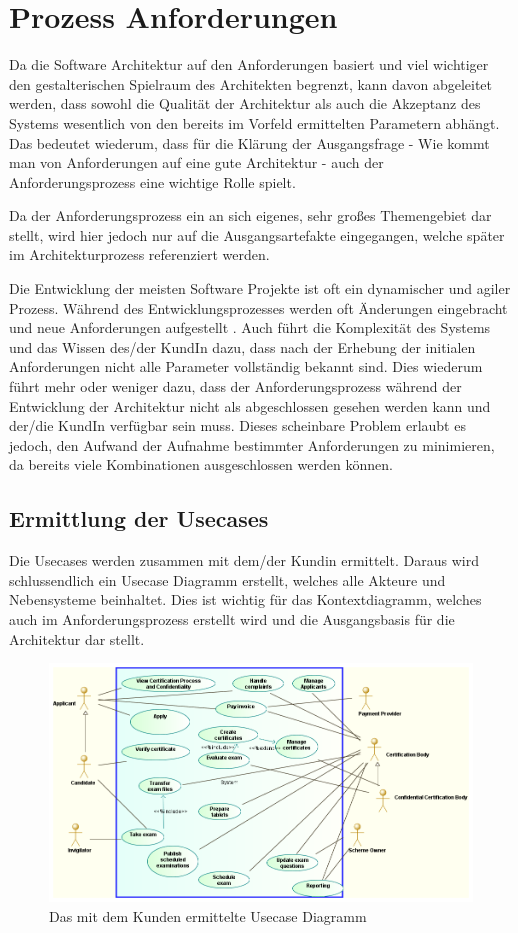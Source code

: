 \chapter{Prozess Anforderungen}
Da die Software Architektur auf den Anforderungen basiert und viel wichtiger \glqq den gestalterischen Spielraum des Architekten\grqq \cite[S. 103]{softarch} begrenzt, kann davon abgeleitet werden, dass sowohl die Qualität der Architektur als auch die Akzeptanz des Systems wesentlich von den bereits im Vorfeld ermittelten Parametern abhängt. Das bedeutet wiederum, dass für die Klärung der Ausgangsfrage - Wie kommt man von Anforderungen auf eine gute Architektur - auch der Anforderungsprozess eine wichtige Rolle spielt.

Da der Anforderungsprozess ein an sich eigenes, sehr großes Themengebiet dar stellt, wird hier jedoch nur auf die Ausgangsartefakte eingegangen, welche später im Architekturprozess referenziert werden.

Die Entwicklung der meisten Software Projekte ist oft ein dynamischer und agiler Prozess. Während des Entwicklungsprozesses werden oft Änderungen eingebracht und neue Anforderungen aufgestellt  \cite[S. 6-7]{effektiv}. Auch führt die Komplexität des Systems und das Wissen des/der KundIn dazu, dass nach der Erhebung der initialen Anforderungen nicht alle Parameter vollständig bekannt sind. Dies wiederum führt mehr oder weniger dazu, dass der Anforderungsprozess während der Entwicklung der Architektur nicht als abgeschlossen gesehen werden kann und der/die KundIn verfügbar sein muss. Dieses scheinbare Problem erlaubt es jedoch, den Aufwand der Aufnahme bestimmter Anforderungen zu minimieren, da bereits viele Kombinationen ausgeschlossen werden können.

\section{Ermittlung der Usecases}
Die Usecases werden zusammen mit dem/der Kundin ermittelt. Daraus wird schlussendlich ein Usecase Diagramm erstellt, welches alle Akteure und Nebensysteme beinhaltet. Dies ist wichtig für das Kontextdiagramm, welches auch im Anforderungsprozess erstellt wird und die Ausgangsbasis für die Architektur dar stellt.

\begin{figure}[!htbp]
    \centering
    \includegraphics[scale=0.4]{uml/usecase.png}
    \caption{Das mit dem Kunden ermittelte Usecase Diagramm}
\end{figure}

